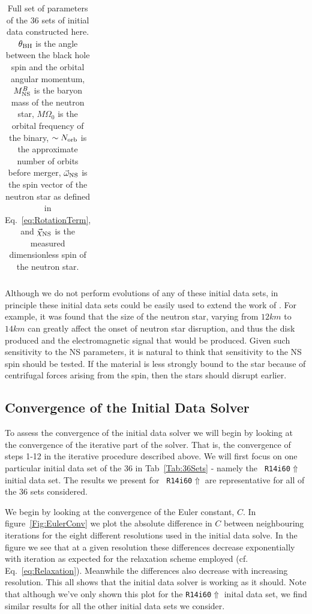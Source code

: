 \begin{longtable}{l|c|c|c|c|c|c}
\caption[Initial data set parameters for series of 36 Bh-Ns initial
data sets.]{\label{tab:FullBHNSParameters}Full set of parameters of
  the 36 sets of initial data constructed here. $\theta_{\rm BH}$ is
  the angle between the black hole spin and the orbital angular
  momentum, $M^B_{\rm NS}$ is the baryon mass of the neutron star,
  $M\Omega_0$ is the orbital frequency of the binary, $\sim N_{\rm
    orb}$ is the approximate number of orbits before merger,
  $\vec{\omega}_{\rm NS}$ is the spin vector of the neutron star as
  defined in Eq.~\ref{eq:RotationTerm}, and $\vec{\chi}_{\rm NS}$ is
  the measured dimensionless spin of the neutron star.}
\end{longtable}

Although we do not perform evolutions of any of these initial data sets, in principle these initial data sets could be easily used to
extend the work of \cite{Foucart:2013a}. For example, it was found
that the size of the neutron star, varying from $12km$ to $14km$ can
greatly affect the onset of neutron star disruption, and thus the disk
produced and the electromagnetic signal that would be produced. Given
such sensitivity to the NS parameters, it is natural to think that
sensitivity to the NS spin should be tested. If the material is less
strongly bound to the star because of centrifugal forces arising from
the spin, then the stars should disrupt earlier.

\subsection{Convergence of the Initial Data Solver}
To assess the convergence of the initial data solver we will begin by looking at the convergence of the iterative part of the solver. That is, the convergence of steps 1-12 in the iterative procedure
described above. We will first focus on one particular initial data
set of the 36 in Tab~\ref{Tab:36Sets} - namely the {\tt
  R14i60$\Uparrow$} initial data set. The results we present for {\tt
  R14i60$\Uparrow$} are representative for all of the 36 sets considered.

We begin by looking at the convergence of the Euler constant, $C$. In figure~\ref{Fig:EulerConv} we plot the absolute difference in $C$ between neighbouring iterations for the eight
different resolutions used in the initial data solve. %
In the figure we see that at a given resolution these differences
decrease exponentially with iteration as expected for the relaxation
scheme employed (cf. Eq.~\ref{eq:Relaxation}). Meanwhile the differences also decrease with increasing resolution. This all shows that the initial data solver is working as it should. Note that although we've only shown
this plot for the {\tt R14i60$\Uparrow$} inital data set, we find similar results for all the other initial data sets we consider.


